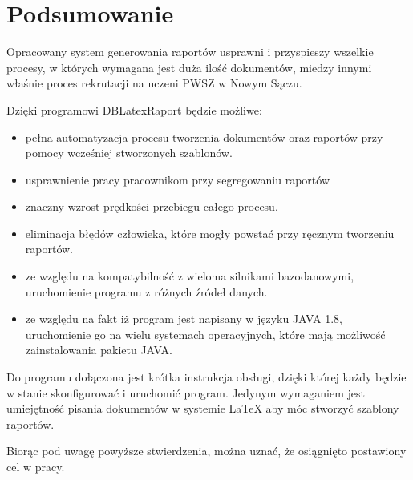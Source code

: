\chapter{Podsumowanie}
Opracowany system generowania raportów usprawni i przyspieszy wszelkie procesy, w których wymagana jest duża ilość dokumentów, miedzy innymi właśnie proces rekrutacji na uczeni PWSZ w Nowym Sączu.
\vspace{5mm}
\par
Dzięki programowi DBLatexRaport będzie możliwe:\vspace{5mm}
\begin{itemize}
\item pełna automatyzacja procesu tworzenia dokumentów oraz raportów przy pomocy wcześniej stworzonych szablonów.\vspace{5mm}
\item usprawnienie pracy pracownikom przy segregowaniu raportów\vspace{5mm}
\item znaczny wzrost prędkości przebiegu całego procesu.\vspace{5mm}
\item eliminacja błędów człowieka, które mogły powstać przy ręcznym tworzeniu raportów.\vspace{5mm}
\item ze względu na kompatybilność z wieloma silnikami bazodanowymi, uruchomienie programu z różnych źródeł danych.\vspace{5mm}
\item ze względu na fakt iż program jest napisany w języku JAVA 1.8, uruchomienie go na wielu systemach operacyjnych, które mają możliwość zainstalowania pakietu JAVA.\vspace{5mm}
\end{itemize}\vspace{5mm}
\par
Do programu dołączona jest krótka instrukcja obsługi, dzięki której każdy będzie w stanie skonfigurować i uruchomić program. Jedynym wymaganiem jest umiejętność pisania dokumentów w systemie LaTeX aby móc stworzyć szablony raportów.
\par 
Biorąc pod uwagę powyższe stwierdzenia, można uznać, że osiągnięto postawiony cel w pracy.